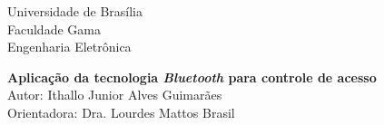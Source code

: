 %





\vspace*{-2cm}

{\bf
\begin{center}

{\large \hspace*{0cm}Universidade de Brasília} \\
\hspace*{0cm}Faculdade Gama \\
\hspace*{0cm}Engenharia Eletrônica

\end{center}}
\vspace{4.0cm}
\noindent
\begin{center}

{\Large \bf  Aplicação da tecnologia \textit{Bluetooth} para controle de acesso }\\[3cm]
{\Large Autor: Ithallo Junior Alves Guimarães}\\[6mm]
{\Large Orientadora: Dra. Lourdes Mattos Brasil}\\[3.0cm]
\end{center}






\newpage
